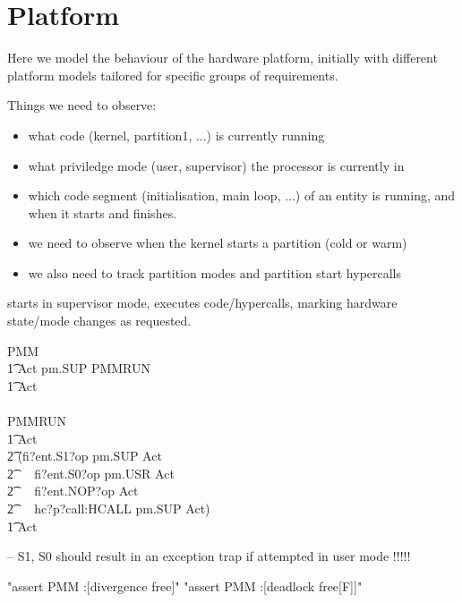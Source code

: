 \section{Platform}

 Here we model the behaviour of the hardware platform, initially with different
 platform models tailored for specific groups of requirements.

Things we need to observe:
  \begin{itemize}
    \item
      what code (kernel, partition1, ...) is currently running
    \item
      what priviledge mode (user, supervisor) the processor is currently in
    \item
      which code segment (initialisation, main loop, ...) of an entity is running,
        and when it starts and finishes.
    \item
      we need to observe when the kernel starts a partition (cold or warm)
    \item
      we also need to track partition modes and partition start hypercalls
  \end{itemize}

starts in supervisor mode, executes code/hypercalls,
marking hardware state/mode changes as requested.
\begin{circus}
\circprocess PMM \circdef \circbegin
\\ \t1 Act \circdef pm.SUP \then PMMRUN
\\ \t1 \circspot Act
\\ \circend
\\
\circprocess PMMRUN \circdef \circbegin
\\ \t1 Act \circdef
\\ \t2 (fi?ent.S1?op \then pm.SUP \then Act
\\ \t2 ~\extchoice~ fi?ent.S0?op \then pm.USR \then Act
\\ \t2 ~\extchoice~ fi?ent.NOP?op \then Act
\\ \t2 ~\extchoice~ hc?p?call:HCALL \then pm.SUP \then Act)
\\ \t1 \circspot Act
\\ \circend
\end{circus}
-- S1, S0 should result in an exception trap if attempted in user mode !!!!!

\begin{assert}
"assert PMM :[divergence free]"
\also "assert PMM :[deadlock free[F]]"
\end{assert}

